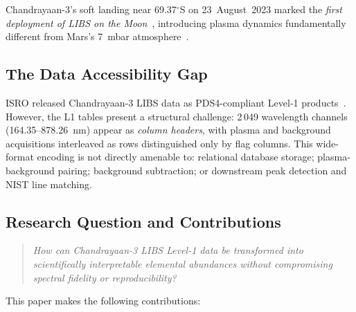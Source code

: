 \documentclass[a4paper,twocolumn,10pt]{article}
\begin{document}
Chandrayaan-3's soft landing near 69.37$^\circ$S on 23~August~2023 marked
the \emph{first deployment of LIBS on the Moon}~\cite{ISROCh3}, introducing
plasma dynamics fundamentally different from Mars's 7~mbar
atmosphere~\cite{Saeidfirozeh2024}.

\subsection{The Data Accessibility Gap}

ISRO released Chandrayaan-3 LIBS data as PDS4-compliant Level-1
products~\cite{Hughes2018}. However, the L1 tables present a structural
challenge: 2\,049 wavelength channels (164.35--878.26~nm) appear as
\emph{column headers}, with plasma and background acquisitions interleaved
as rows distinguished only by flag columns. This wide-format encoding is
not directly amenable to: relational database storage; plasma-background
pairing; background subtraction; or downstream peak detection and NIST
line matching.

\subsection{Research Question and Contributions}

\begin{quote}
\emph{How can Chandrayaan-3 LIBS Level-1 data be transformed into
scientifically interpretable elemental abundances without compromising
spectral fidelity or reproducibility?}
\end{quote}

This paper makes the following contributions:
\end{document}
